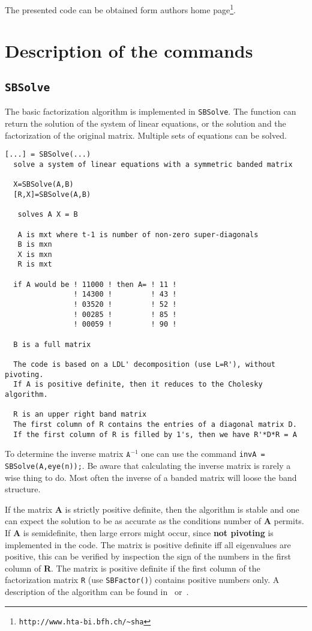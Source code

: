 \documentclass[11pt]{article}
\begin{document}
The presented code can be obtained form authors home
page\footnote{\texttt{http://www.hta-bi.bfh.ch/\~{}sha}}.


\section{Description of the commands}
 
\subsection{\texttt{SBSolve}}
The basic factorization algorithm is implemented in \texttt{SBSolve}. The
function can return the solution of the system of linear equations, or the
solution and the factorization of the original matrix.
Multiple sets of equations can be solved.

\begin{verbatim}
[...] = SBSolve(...)
  solve a system of linear equations with a symmetric banded matrix

  X=SBSolve(A,B)
  [R,X]=SBSolve(A,B)

   solves A X = B

   A is mxt where t-1 is number of non-zero super-diagonals
   B is mxn
   X is mxn
   R is mxt

  if A would be ! 11000 ! then A= ! 11 ! 
                ! 14300 !         ! 43 ! 
                ! 03520 !         ! 52 ! 
                ! 00285 !         ! 85 ! 
                ! 00059 !         ! 90 ! 

  B is a full matrix

  The code is based on a LDL' decomposition (use L=R'), without pivoting.
  If A is positive definite, then it reduces to the Cholesky algorithm.

  R is an upper right band matrix
  The first column of R contains the entries of a diagonal matrix D. 
  If the first column of R is filled by 1's, then we have R'*D*R = A
\end{verbatim}

To determine the inverse matrix $\mathtt{A}^{-1}$ one can
use the command \texttt{invA = SBSolve(A,eye(n));}.  Be aware that calculating
the inverse matrix is rarely a wise thing to do. Most often the inverse of a
banded matrix will loose the band structure.

If the matrix \textbf{A} is strictly positive definite, then the algorithm is
stable and one can expect the solution to be as accurate as the conditions
number of \textbf{A} permits. If \textbf{A} is semidefinite, then large errors
might occur, since \textbf{not pivoting} is implemented in the code. The
matrix is positive definite iff all eigenvalues are positive, this can be
verified by inspection the sign of the numbers in the first column of
\textbf{R}.  The matrix is positive definite if the first column of the
factorization matrix \texttt{R} (use \texttt{SBFactor()}) contains positive
numbers only. A description of the algorithm can be found
in~\cite{GoluVanLoan96} or~\cite{VarFem}.
\end{document}
